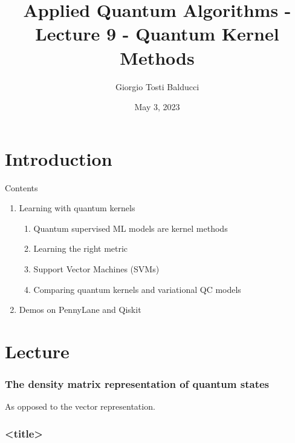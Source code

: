 \documentclass[aspectratio=43]{beamer}
\title[]{Applied Quantum Algorithms - Lecture 9 - Quantum Kernel Methods}
\institute[]{Delft University of Technology, The Netherlands}
\author{Giorgio Tosti Balducci}
\date{May 3, 2023}
\begin{document}
\section{Introduction}
{
\frame{\titlepage}
}

\begin{frame}{Contents} %
\begin{enumerate}
  \item Learning with quantum kernels
  \begin{enumerate}
    \item Quantum supervised ML models are kernel methods
    \item Learning the right metric
    \item Support Vector Machines (SVMs)
    \item Comparing quantum kernels and variational QC models
  \end{enumerate}
  \item Demos on PennyLane and Qiskit
\end{enumerate}
\end{frame}

\section{Lecture}

\begin{frame}
  \frametitle{The density matrix representation of quantum states}
    As opposed to the vector representation.
\end{frame}


\begin{frame}
  \frametitle{<title>}

  

\end{frame}

\end{document}
